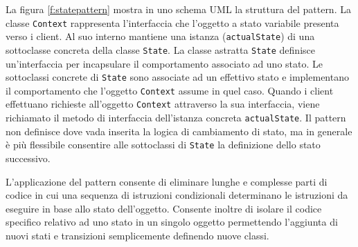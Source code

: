 La figura \ref{f:statepattern} mostra in uno schema \ac{UML} la struttura del pattern. La classe \texttt{Context} rappresenta l'interfaccia che l'oggetto a stato variabile presenta verso i client. Al suo interno mantiene una istanza (\texttt{actualState}) di una sottoclasse concreta della classe \texttt{State}.
La classe astratta \texttt{State} definisce un'interfaccia per incapsulare il comportamento associato ad uno stato.
Le sottoclassi concrete di \texttt{State} sono associate ad un effettivo stato e implementano il comportamento che l'oggetto \texttt{Context} assume in quel caso.
Quando i client effettuano richieste all'oggetto \texttt{Context} attraverso la sua interfaccia, viene richiamato il metodo di interfaccia dell'istanza concreta \texttt{actualState}.
Il pattern non definisce dove vada inserita la logica di cambiamento di stato, ma in generale è più flessibile consentire alle sottoclassi di \texttt{State} la definizione dello stato successivo.

L'applicazione del pattern consente di eliminare lunghe e complesse parti di codice in cui una sequenza di istruzioni condizionali determinano le istruzioni da eseguire in base allo stato dell'oggetto. Consente inoltre di isolare il codice specifico relativo ad uno stato in un singolo oggetto permettendo l'aggiunta di nuovi stati e transizioni semplicemente definendo nuove classi.